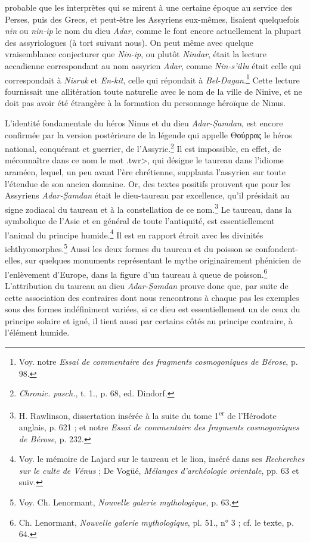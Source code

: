 \documentclass[a4paper, 11pt, oneside]{article}
\begin{document}
probable que les interprètes qui se mirent à une certaine époque au service des Perses, puis des Grecs, et peut-être les Assyriens eux-mêmes, lisaient quelquefois \emph{nin} ou \emph{nin-ip} le nom du dieu \emph{Adar}, comme le font encore actuellement la plupart des assyriologues (à tort suivant nous). On peut même avec quelque vraisemblance conjecturer que \emph{Nin-ip}, ou plutôt \emph{Nindar}, était la lecture accadienne correspondant au nom assyrien \emph{Adar}, comme \emph{Nin-s'illu} était celle qui correspondait à \emph{Nisruk} et \emph{En-kit}, celle qui répondait à \emph{Bel-Dagan}.\footnote{Voy. notre \emph{Essai de commentaire des fragments cosmogoniques de Bérose}, p. 98.} Cette lecture fournissait une allitération toute naturelle avec le nom de la ville de Ninive, et ne doit pas avoir été étrangère à la formation du personnage héroïque de Ninus.

L'identité fondamentale du héros Ninus et du dieu \emph{Adar-\d{S}amdan}, est encore confirmée par la version postérieure de la légende qui appelle Θούρρας le héros national, conquérant et guerrier, de l'Assyrie.\footnote{\emph{Chronic. pasch.}, t. 1., p. 68, ed. Dindorf.} Il est impossible, en effet, de méconnaître dans ce nom le mot \<.twr>, qui désigne le taureau dans l'idiome araméen, lequel, un peu avant l'ère chrétienne, supplanta l'assyrien sur toute l'étendue de son ancien domaine. Or, des textes positifs prouvent que pour les Assyriens \emph{Adar-\d{S}amdan} était le dieu-taureau par excellence, qu'il présidait au signe zodiacal du taureau et à la constellation de ce nom.\footnote{H. Rawlinson, dissertation insérée à la suite du tome 1\textsuperscript{er} de l'Hérodote anglais, p. 621 ; et notre \emph{Essai de commentaire des fragments cosmogoniques de Bérose}, p. 232.} Le taureau, dans la symbolique de l'Asie et en général de toute l'antiquité, est essentiellement l'animal du principe humide.\footnote{Voy. le mémoire de Lajard sur le taureau et le lion, inséré dans ses \emph{Recherches sur le culte de Vénus} ; De Vogüé, \emph{Mélanges d'archéologie orientale}, pp. 63 et suiv.} Il est en rapport étroit avec les divinités ichthyomorphes.\footnote{Voy. Ch. Lenormant, \emph{Nouvelle galerie mythologique}, p. 63.} Aussi les deux formes du taureau et du poisson se confondent-elles, sur quelques monuments représentant le mythe originairement phénicien de l'enlèvement d'Europe, dans la figure d'un taureau à queue de poisson.\footnote{Ch. Lenormant, \emph{Nouvelle galerie mythologique}, pl. 51., n° 3 ; cf. le texte, p. 64.} L'attribution du taureau au dieu \emph{Adar-\d{S}amdan} prouve donc que, par suite de cette association des contraires dont nous rencontrons à chaque pas les exemples sous des formes indéfiniment variées, si ce dieu est essentiellement un de ceux du principe solaire et igné, il tient aussi par certains côtés au principe contraire, à l'élément humide.
\end{document}

